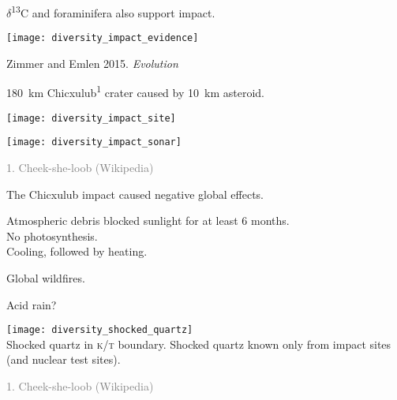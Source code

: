 \documentclass[t]{beamer}
\newcommand{\backskip}{\vspace{-0.5\baselineskip}}
\begin{document}


\begin{frame}{$\delta$\textsuperscript{13}C and foraminifera also support impact.}

\backskip

\centering

\texttt{[image: diversity\_impact\_evidence]}
	
\tinyfill \textcopyright Zimmer and Emlen 2015. \textit{Evolution}

\end{frame}




\begin{frame}{180~km Chicxulub\textsuperscript{1} crater caused by 10~km asteroid.}

\backskip

\begin{multicols}{2}

\texttt{[image: diversity\_impact\_site]}

\columnbreak

\texttt{[image: diversity\_impact\_sonar]}
\end{multicols}

\centering

\vfilll
	
\tiny \textcolor{gray}{1. Cheek-she-loob (Wikipedia)}


\end{frame}


\begin{frame}{The Chicxulub impact caused negative global effects.}

\backskip

\begin{multicols}{2}

\hangpara Atmospheric debris blocked sunlight for at least 6 months.
\\
\hspace*{1em} No photosynthesis.
\\
\hspace*{1em} Cooling, followed by heating.

\hangpara Global wildfires.

\hangpara Acid rain?

\columnbreak

\noindent \texttt{[image: diversity\_shocked\_quartz]}\\
\noindent Shocked quartz in \textsc{k/t} boundary. Shocked quartz known only from impact sites (and nuclear test sites).


\end{multicols}

\vfilll
	
\tiny \textcolor{gray}{1. Cheek-she-loob (Wikipedia)}

\end{frame}
\end{document}
